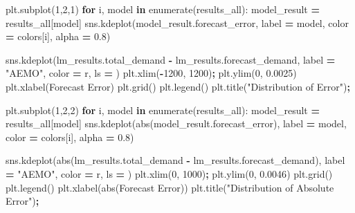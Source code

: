 \documentclass[mstat,12pt]{unswthesis}
\newenvironment{Shaded}{\begin{snugshade}}{\end{snugshade}}
\newcommand{\BuiltInTok}[1]{#1}
\newcommand{\ControlFlowTok}[1]{\textcolor[rgb]{0.13,0.29,0.53}{\textbf{#1}}}
\newcommand{\DecValTok}[1]{\textcolor[rgb]{0.00,0.00,0.81}{#1}}
\newcommand{\FloatTok}[1]{\textcolor[rgb]{0.00,0.00,0.81}{#1}}
\newcommand{\KeywordTok}[1]{\textcolor[rgb]{0.13,0.29,0.53}{\textbf{#1}}}
\newcommand{\NormalTok}[1]{#1}
\newcommand{\OperatorTok}[1]{\textcolor[rgb]{0.81,0.36,0.00}{\textbf{#1}}}
\newcommand{\StringTok}[1]{\textcolor[rgb]{0.31,0.60,0.02}{#1}}
\begin{document}
\begin{Shaded}
\begin{Highlighting}[]
\NormalTok{plt.subplot(}\DecValTok{1}\NormalTok{,}\DecValTok{2}\NormalTok{,}\DecValTok{1}\NormalTok{)}
\ControlFlowTok{for}\NormalTok{ i, model }\KeywordTok{in} \BuiltInTok{enumerate}\NormalTok{(results\_all):}
\NormalTok{    model\_result }\OperatorTok{=}\NormalTok{ results\_all[model]}
\NormalTok{    sns.kdeplot(model\_result.forecast\_error, label }\OperatorTok{=}\NormalTok{ model, }
\NormalTok{      color }\OperatorTok{=}\NormalTok{ colors[i], alpha }\OperatorTok{=} \FloatTok{0.8}\NormalTok{)}
    
\NormalTok{sns.kdeplot(lm\_results.total\_demand }\OperatorTok{{-}} 
\NormalTok{    lm\_results.forecast\_demand, label }\OperatorTok{=} \StringTok{"AEMO"}\NormalTok{, color }\OperatorTok{=} \StringTok{\textquotesingle{}r\textquotesingle{}}\NormalTok{, ls }\OperatorTok{=} \StringTok{\textquotesingle{}{-}{-}\textquotesingle{}}\NormalTok{)}
\NormalTok{plt.xlim(}\OperatorTok{{-}}\DecValTok{1200}\NormalTok{, }\DecValTok{1200}\NormalTok{)}\OperatorTok{;}
\NormalTok{plt.ylim(}\DecValTok{0}\NormalTok{, }\FloatTok{0.0025}\NormalTok{)}
\NormalTok{plt.xlabel(}\StringTok{\textquotesingle{}Forecast Error\textquotesingle{}}\NormalTok{)}
\NormalTok{plt.grid()}
\NormalTok{plt.legend()}
\NormalTok{plt.title(}\StringTok{"Distribution of Error"}\NormalTok{)}\OperatorTok{;}

\NormalTok{plt.subplot(}\DecValTok{1}\NormalTok{,}\DecValTok{2}\NormalTok{,}\DecValTok{2}\NormalTok{)}
\ControlFlowTok{for}\NormalTok{ i, model }\KeywordTok{in} \BuiltInTok{enumerate}\NormalTok{(results\_all):}
\NormalTok{    model\_result }\OperatorTok{=}\NormalTok{ results\_all[model]}
\NormalTok{    sns.kdeplot(}\BuiltInTok{abs}\NormalTok{(model\_result.forecast\_error), }
\NormalTok{      label }\OperatorTok{=}\NormalTok{ model, color }\OperatorTok{=}\NormalTok{ colors[i], alpha }\OperatorTok{=} \FloatTok{0.8}\NormalTok{)}
    
\NormalTok{sns.kdeplot(}\BuiltInTok{abs}\NormalTok{(lm\_results.total\_demand }\OperatorTok{{-}} 
\NormalTok{    lm\_results.forecast\_demand), label }\OperatorTok{=} \StringTok{"AEMO"}\NormalTok{, color }\OperatorTok{=} \StringTok{\textquotesingle{}r\textquotesingle{}}\NormalTok{, }
\NormalTok{    ls }\OperatorTok{=} \StringTok{\textquotesingle{}{-}{-}\textquotesingle{}}\NormalTok{)}
\NormalTok{plt.xlim(}\DecValTok{0}\NormalTok{, }\DecValTok{1000}\NormalTok{)}\OperatorTok{;}
\NormalTok{plt.ylim(}\DecValTok{0}\NormalTok{, }\FloatTok{0.0046}\NormalTok{)}
\NormalTok{plt.grid()}
\NormalTok{plt.legend()}
\NormalTok{plt.xlabel(}\StringTok{\textquotesingle{}abs(Forecast Error)\textquotesingle{}}\NormalTok{)}
\NormalTok{plt.title(}\StringTok{"Distribution of Absolute Error"}\NormalTok{)}\OperatorTok{;}
\end{Highlighting}
\end{Shaded}
\end{document}
